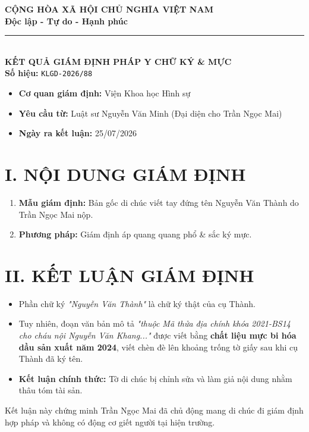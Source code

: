 \documentclass[12pt,a4paper]{article}
\begin{document}
\begin{center}
    \textbf{\Large CỘNG HÒA XÃ HỘI CHỦ NGHĨA VIỆT NAM}\\
    \textbf{\large Độc lập - Tự do - Hạnh phúc}\\
    \rule{8cm}{0.5pt}\\[0.5cm]
    
    \textbf{\LARGE KẾT QUẢ GIÁM ĐỊNH PHÁP Y CHỮ KÝ \& MỰC}\\
    \textbf{Số hiệu:} \texttt{KLGD-2026/88}
\end{center}

\vspace{0.3cm}

\begin{tcolorbox}[colback=gray!10!white,colframe=black!75!black,title=\textbf{THÔNG TIN GIÁM ĐỊNH}]
\begin{itemize}[leftmargin=*]
    \item \textbf{Cơ quan giám định:} Viện Khoa học Hình sự
    \item \textbf{Yêu cầu từ:} Luật sư Nguyễn Văn Minh (Đại diện cho Trần Ngọc Mai)
    \item \textbf{Ngày ra kết luận:} 25/07/2026
\end{itemize}
\end{tcolorbox}

\section*{I. NỘI DUNG GIÁM ĐỊNH}
\begin{enumerate}
    \item \textbf{Mẫu giám định:} Bản gốc di chúc viết tay đứng tên Nguyễn Văn Thành do Trần Ngọc Mai nộp.
    \item \textbf{Phương pháp:} Giám định áp quang quang phổ \& sắc ký mực.
\end{enumerate}

\section*{II. KẾT LUẬN GIÁM ĐỊNH}
\begin{itemize}
    \item Phần chữ ký \textit{"Nguyễn Văn Thành"} là chữ ký thật của cụ Thành.
    \item Tuy nhiên, đoạn văn bản mô tả \textit{"thuộc Mã thửa địa chính khóa 2021-BS14 cho cháu nội Nguyễn Văn Khang..."} được viết bằng \textbf{chất liệu mực bi hóa dầu sản xuất năm 2024}, viết chèn đè lên khoảng trống tờ giấy sau khi cụ Thành đã ký tên.
    \item \textbf{Kết luận chính thức:} Tờ di chúc bị chỉnh sửa và làm giả nội dung nhằm thâu tóm tài sản.
\end{itemize}

\vspace{1cm}

\begin{tcolorbox}[colback=blue!5!white,colframe=blue!75!black,title=\textbf{Ý NGHĨA PHÁP LÝ}]
Kết luận này chứng minh Trần Ngọc Mai đã chủ động mang di chúc đi giám định hợp pháp và không có động cơ giết người tại hiện trường.
\end{tcolorbox}
\end{document}
